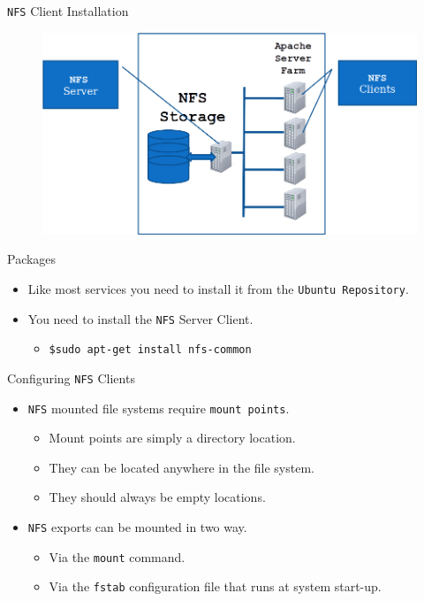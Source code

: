 \documentclass[xcolor=table]{beamer}
\begin{document}
\begin{frame}{\texttt{NFS} Client Installation}
  \begin{figure}
    \begin{center}
      \includegraphics[width=1\linewidth]{NFSClients.png}
    \end{center}
  \end{figure}
\end{frame}

\begin{frame}{Packages}
  \begin{itemize}
    \item Like most services you need to install it from the \texttt{Ubuntu Repository}.
    \item You need to install the \texttt{NFS} Server Client.
      \begin{itemize}
        \item \texttt{\$sudo apt-get install nfs-common}
      \end{itemize}
  \end{itemize}
\end{frame}

\begin{frame}{Configuring \texttt{NFS} Clients}
  \begin{itemize}
    \item \texttt{NFS} mounted file systems require \texttt{mount points}.
      \begin{itemize}
        \item Mount points are simply a directory location.
        \item They can be located anywhere in the file system.
        \item They should always be empty locations.
      \end{itemize}
    \item \texttt{NFS} exports can be mounted in two way. 
      \begin{itemize}
        \item Via the \texttt{mount} command. 
        \item Via the \texttt{fstab} configuration file that runs at system start-up.
      \end{itemize}
  \end{itemize}
\end{frame}
\end{document}
